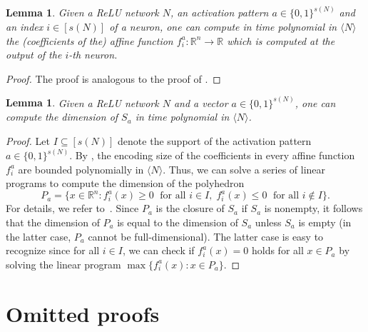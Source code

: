\documentclass{article}
\newtheorem{lemma}[theorem]{Lemma}
\begin{document}
\begin{lemma}
\label{lem:pattern_to_function_is_poly_time_computable}
    Given a ReLU network $N$, an activation pattern $a\in \{0,1\}^{s(N)}$ and an index $i\in [s(N)]$ of a neuron, one can compute in time polynomial in $\langle N\rangle$ the (coefficients of the) affine function $f^a_i:\mathbb{R}^n\to \mathbb{R}$ which is computed at the output of the $i$-th neuron.
\end{lemma}
\begin{proof}
    The proof is analogous to the proof of .
\end{proof}
\begin{lemma}
\label{lem:dim_of_activation_region_is_poly_time_computable}
    Given a ReLU network $N$ and a vector $a\in \{0,1\}^{s(N)}$, one can compute the dimension of $S_a$ in time polynomial in $\langle N\rangle$.
\end{lemma}
\begin{proof}
    Let $I\subseteq [s(N)]$ denote the support of the activation pattern $a\in \{0,1\}^{s(N)}$.
    By , the encoding size of the coefficients in every affine function $f^a_i$ are bounded polynomially in $\langle N\rangle$. Thus, we can solve a series of linear programs to compute the dimension of the polyhedron
    \[
    P_a = \{x\in \mathbb{R}^n: f_i^a(x)\geq 0\; \text{ for all } i\in I,\; f_i^a(x) \leq 0\; \text{ for all } i\notin I\}.
    \]
    For details, we refer to~\cite[Section 7.3]{20.500.11850/426218}.
    Since $P_a$ is the closure of $S_a$ if $S_a$ is nonempty, it follows that the dimension of $P_a$ is equal to the dimension of $S_a$ unless $S_a$ is empty (in the latter case, $P_a$ cannot be full-dimensional).
    The latter case is easy to recognize since for all $i\in I$, we can check if $f_i^a(x)=0$ holds for all $x\in P_a$ by solving the linear program $\max\{f_i^a(x) : x\in P_a\}$.
\end{proof}
\section{Omitted proofs}
\end{document}
